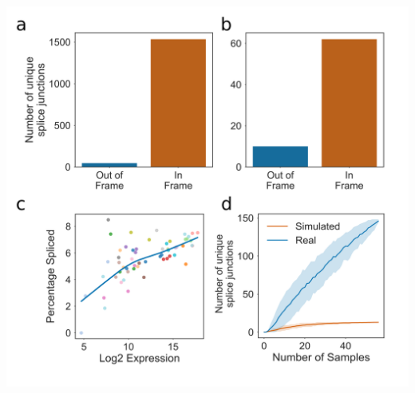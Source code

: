 \documentclass[12pt,a4paper,]{report}
\let\origfigure=\figure
\let\endorigfigure=\endfigure
\renewenvironment{figure}[1][2] {
    \expandafter\origfigure\expandafter[H]
} {
    \endorigfigure
}
\begin{document}
\newpage

\begin{figure}[htbp]
\centering
\includegraphics[width=\textwidth,height=562pt,keepaspectratio]{chapter_6/figures/splice_site_frame_and_simulation.png}
\caption[Splice junction motifs for EXT9 and LRX3]{\textbf{Splice   junction   motifs   for   EXT9   and   LRX3}   \textbf{a}   \&   \textbf{b)}   Frequency   barplots   showing   number   of   In/Out   of   frame   splice   junctions   for   EXT9   and   LRX3   respectively.   \textbf{c)}   Scatterplot   showing   percentage   of   reads   with   splicing   versus   log2   counts   per   million   for   EXT9.   \textbf{d)}   Bootstrapped   splicing   simulation   showing   number   of   unique   EXT9   splice   junctions   discovered   with   increasing   numbers   of   samples   for   real   root   RNAseq   data   versus   paired   simulated   RNAseq   data.   Errorbars   are   67\%   confidence   intervals.   \label{splice_frame}}
\end{figure}
\end{document}
